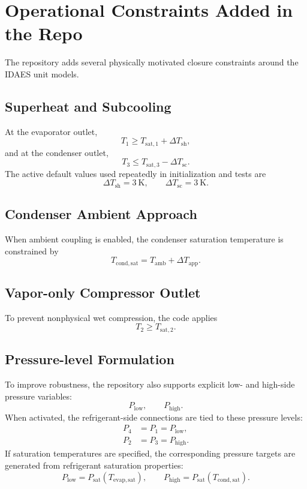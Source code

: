 \documentclass[11pt]{article}
\begin{document}
\section{Operational Constraints Added in the Repo}
The repository adds several physically motivated closure constraints around the IDAES unit models.

\subsection{Superheat and Subcooling}
At the evaporator outlet,
\begin{equation}
T_1 \ge T_{\mathrm{sat},1} + \Delta T_{\mathrm{sh}},
\end{equation}
and at the condenser outlet,
\begin{equation}
T_3 \le T_{\mathrm{sat},3} - \Delta T_{\mathrm{sc}}.
\end{equation}
The active default values used repeatedly in initialization and tests are
\begin{equation}
\Delta T_{\mathrm{sh}} = 3~\mathrm{K},
\qquad
\Delta T_{\mathrm{sc}} = 3~\mathrm{K}.
\end{equation}

\subsection{Condenser Ambient Approach}
When ambient coupling is enabled, the condenser saturation temperature is constrained by
\begin{equation}
T_{\mathrm{cond,sat}} = T_{\mathrm{amb}} + \Delta T_{\mathrm{app}}.
\end{equation}

\subsection{Vapor-only Compressor Outlet}
To prevent nonphysical wet compression, the code applies
\begin{equation}
T_2 \ge T_{\mathrm{sat},2}.
\end{equation}

\subsection{Pressure-level Formulation}
To improve robustness, the repository also supports explicit low- and high-side pressure variables:
\begin{equation}
P_{\mathrm{low}}, \qquad P_{\mathrm{high}}.
\end{equation}
When activated, the refrigerant-side connections are tied to these pressure levels:
\begin{align}
P_4 &= P_1 = P_{\mathrm{low}}, \\
P_2 &= P_3 = P_{\mathrm{high}}.
\end{align}
If saturation temperatures are specified, the corresponding pressure targets are generated from refrigerant saturation properties:
\begin{equation}
P_{\mathrm{low}} = P_{\mathrm{sat}}(T_{\mathrm{evap,sat}}),
\qquad
P_{\mathrm{high}} = P_{\mathrm{sat}}(T_{\mathrm{cond,sat}}).
\end{equation}
\end{document}
